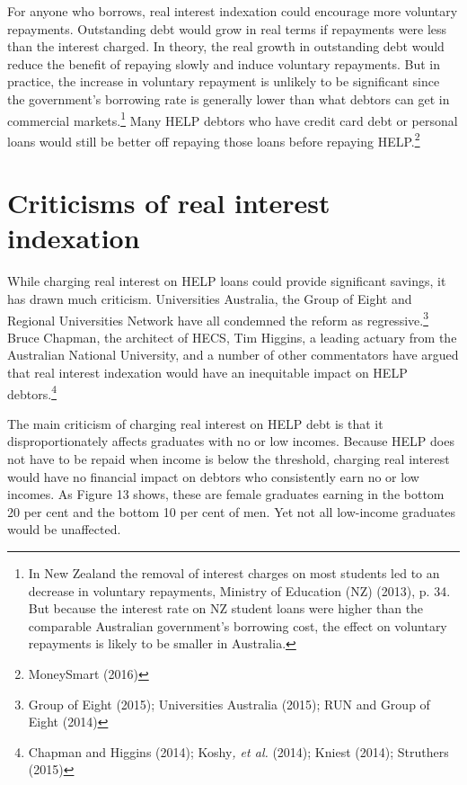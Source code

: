\documentclass[]{book}
\begin{document}
For anyone who borrows, real interest indexation could encourage more voluntary repayments. Outstanding debt would grow in real terms if repayments were less than the interest charged. In theory, the real growth in outstanding debt would reduce the benefit of repaying slowly and induce voluntary repayments. But in practice, the increase in voluntary repayment is unlikely to be significant since the government's borrowing rate is generally lower than what debtors can get in commercial markets.\footnote{In New Zealand the removal of interest charges on most students led to an decrease in voluntary repayments, Ministry of Education (NZ) (2013), p. 34. But because the interest rate on NZ student loans were higher than the comparable Australian government's borrowing cost, the effect on voluntary repayments is likely to be smaller in Australia.} Many HELP debtors who have credit card debt or personal loans would still be better off repaying those loans before repaying HELP.\footnote{MoneySmart (2016)}

\section{\texorpdfstring{\protect\hypertarget{_Ref438047461}{}{\protect\hypertarget{_Ref333580055}{}{}}Criticisms of real interest indexation}{Criticisms of real interest indexation}}\label{criticisms-of-real-interest-indexation}

While charging real interest on HELP loans could provide significant savings, it has drawn much criticism. Universities Australia, the Group of Eight and Regional Universities Network have all condemned the reform as regressive.\footnote{Group of Eight (2015); Universities Australia (2015); RUN and Group of Eight (2014)} Bruce Chapman, the architect of HECS, Tim Higgins, a leading actuary from the Australian National University, and a number of other commentators have argued that real interest indexation would have an inequitable impact on HELP debtors.\footnote{Chapman and Higgins (2014); Koshy\emph{, et al.} (2014); Kniest (2014); Struthers (2015)}

The main criticism of charging real interest on HELP debt is that it disproportionately affects graduates with no or low incomes. Because HELP does not have to be repaid when income is below the threshold, charging real interest would have no financial impact on debtors who consistently earn no or low incomes. As Figure 13 shows, these are female graduates earning in the bottom 20 per cent and the bottom 10 per cent of men. Yet not all low-income graduates would be unaffected.
\end{document}
